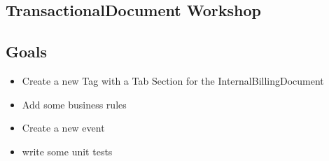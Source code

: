 \begin{ifhtml}
    \begin{s5slide}
        \section{TransactionalDocument Workshop}
        \subsection{Goals}
        \begin{itemize}
          \item Create a new Tag with a Tab Section for the InternalBillingDocument
          \item Add some business rules
          \item Create a new event
          \item write some unit tests
        \end{itemize}
    \end{s5slide}
\end{ifhtml}